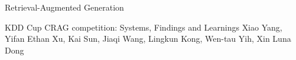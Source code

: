 \documentclass[11pt]{article}
\begin{document}
\begin{bulletin}
\begin{articlesection}{Retrieval-Augmented Generation}
\begin{article}
{KDD Cup CRAG competition: Systems, Findings and Learnings}
{Xiao Yang, Yifan Ethan Xu, Kai Sun, Jiaqi Wang, Lingkun Kong, Wen-tau Yih, Xin Luna Dong}
\setcounter{section}{0}

\end{article}

\end{articlesection}




% 



\begin{callsection}


\end{callsection}
\end{bulletin}
\end{document}
